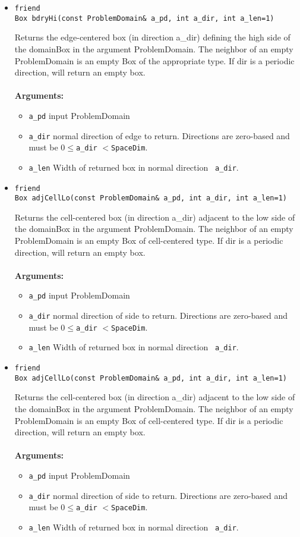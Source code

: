 \begin{itemize}
\item
\begin{verbatim}
friend
Box bdryHi(const ProblemDomain& a_pd, int a_dir, int a_len=1)
\end{verbatim}
Returns the edge-centered box (in direction a\_dir) defining the high
side of the domainBox in the argument ProblemDomain.  The neighbor of
an empty ProblemDomain is an empty Box of the appropriate type.  If
dir is a periodic direction, will return an empty box. \\ 
\\
{\bf Arguments:}
\begin{itemize}
\item \verb/a_pd/ input ProblemDomain
\item \verb/a_dir/ normal direction of edge to return.  Directions are
zero-based and must be $0 \leq${\tt a\_dir} $<${\tt SpaceDim}.
\item \verb/a_len/ Width of returned box in normal direction {\tt
a\_dir}.
\end{itemize}


\item
\begin{verbatim}
friend
Box adjCellLo(const ProblemDomain& a_pd, int a_dir, int a_len=1)
\end{verbatim}
Returns the cell-centered box (in direction a\_dir) adjacent to the low
side of the domainBox in the argument ProblemDomain.  The neighbor of
an empty ProblemDomain is an empty Box of cell-centered type.  If
dir is a periodic direction, will return an empty box. \\ 
\\
{\bf Arguments:}
\begin{itemize}
\item \verb/a_pd/ input ProblemDomain
\item \verb/a_dir/ normal direction of side to return.  Directions are
zero-based and must be $0 \leq${\tt a\_dir} $<${\tt SpaceDim}.
\item \verb/a_len/ Width of returned box in normal direction {\tt
a\_dir}.
\end{itemize}

\item
\begin{verbatim}
friend
Box adjCellLo(const ProblemDomain& a_pd, int a_dir, int a_len=1)
\end{verbatim}
Returns the cell-centered box (in direction a\_dir) adjacent to the low
side of the domainBox in the argument ProblemDomain.  The neighbor of
an empty ProblemDomain is an empty Box of cell-centered type.  If
dir is a periodic direction, will return an empty box. \\ 
\\
{\bf Arguments:}
\begin{itemize}
\item \verb/a_pd/ input ProblemDomain
\item \verb/a_dir/ normal direction of side to return.  Directions are
zero-based and must be $0 \leq${\tt a\_dir} $<${\tt SpaceDim}.
\item \verb/a_len/ Width of returned box in normal direction {\tt
a\_dir}.
\end{itemize}


\end{itemize}
